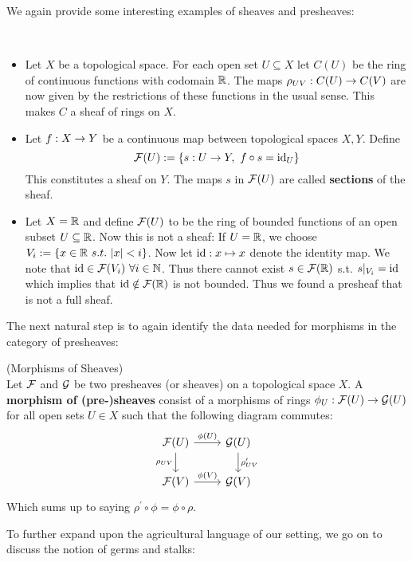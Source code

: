 We again provide some interesting examples of sheaves and presheaves:

\begin{example}~
\begin{itemize}
  \item Let $X$ be a topological space. For each open set $U\subseteq X$ let $C(U)$ be the ring of continuous functions with codomain $\mathbb{R}$. The maps $\rho_{UV}:C(U)\rightarrow C(V)$ are now given by the restrictions of these functions in the usual sense. This makes $C$ a sheaf of rings on $X$.
  \item Let $f:X\rightarrow Y$ be a continuous map between topological spaces $X,Y$. Define
  $$ {\mathcal{F}}(U):=\{ s:U\rightarrow Y, \ f\circ s = \operatorname{id}_U \} $$
  This constitutes a sheaf on $Y$. The maps $s$ in ${\mathcal{F}}(U)$ are called \textbf{sections} of the sheaf.
  \item Let $X= \mathbb{R}$ and define ${\mathcal{F}}(U)$ to be the ring of bounded functions of an open subset $U\subseteq \mathbb{R}$. Now this is not a sheaf: If $U = \mathbb{R}$, we choose $V_i := \{x \in \mathbb{R} \ s.t. \ |x| <i \}$. Now let $\operatorname{id} :x \mapsto x$ denote the identity map. We note that $\operatorname{id} \in {\mathcal{F}}(V_i) \ \forall i \in \mathbb{N}$. Thus there cannot exist $s \in {\mathcal{F}}(\mathbb{R})$ s.t. $s|_{V_i} = \operatorname{id}$ which implies that $\operatorname{id} \notin {\mathcal{F}}(\mathbb{R})$ is not bounded. Thus we found a presheaf that is not a full sheaf.
\end{itemize}
\end{example}

The next natural step is to again identify the data needed for morphisms in the category of presheaves:

\begin{definition} (Morphisms of Sheaves)\\
  Let ${\mathcal{F}}$ and ${\mathcal{G}}$ be two presheaves (or sheaves) on a topological space $X$. A \textbf{morphism of (pre-)sheaves} consist of a morphisms of rings $\phi_U: \FF(U) \ra \GG(U)$ for all open sets $U \in X$ such that the following diagram commutes:
  \[
  \begin{tikzcd}
    \FF(U) \arrow{r}{\phi(U)} \arrow[swap]{d}{\rho_{UV}} & \GG(U) \arrow{d}{\rho^\prime_{UV}} \\
    \FF(V) \arrow{r}{\phi(V)} & \GG(V)
  \end{tikzcd}
  \]
  Which sums up to saying $\rho^\prime \circ \phi = \phi \circ \rho$.
\end{definition}

To further expand upon the agricultural language of our setting, we go on to discuss the notion of germs and stalks:

